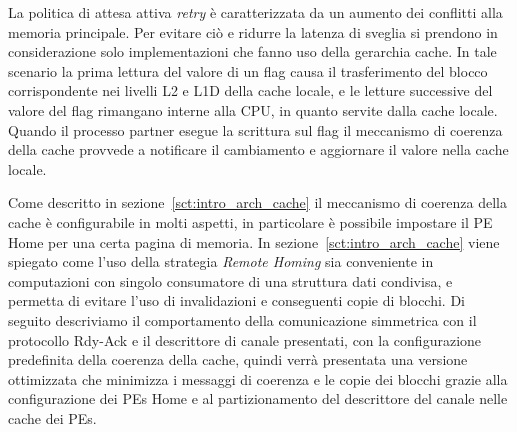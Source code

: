 La politica di attesa attiva \emph{retry} \`e caratterizzata da un aumento dei conflitti alla memoria principale. Per evitare ci\`o e ridurre la latenza di sveglia si prendono in considerazione solo implementazioni che fanno uso della gerarchia cache. In tale scenario la prima lettura del valore di un flag causa il trasferimento del blocco corrispondente nei livelli L2 e L1D della cache locale, e le letture successive del valore del flag rimangano interne alla CPU, in quanto servite dalla cache locale. Quando il processo partner esegue la scrittura sul flag il meccanismo di coerenza della cache provvede a notificare il cambiamento e aggiornare il valore nella cache locale.

Come descritto in sezione~\ref{sct:intro_arch_cache} il meccanismo di coerenza della cache \`e configurabile in molti aspetti, in particolare \`e possibile impostare il PE Home per una certa pagina di memoria. 
In sezione~\ref{sct:intro_arch_cache} viene spiegato come l'uso della strategia \emph{Remote Homing} sia conveniente in computazioni con singolo consumatore di una struttura dati condivisa, e permetta di evitare l'uso di invalidazioni e conseguenti copie di blocchi.
Di seguito descriviamo il comportamento della comunicazione simmetrica con il protocollo Rdy-Ack e il descrittore di canale presentati, con la configurazione predefinita della coerenza della cache, quindi verr\`a presentata una versione ottimizzata che minimizza i messaggi di coerenza e le copie dei blocchi grazie alla configurazione dei PEs Home e al partizionamento del descrittore del canale nelle cache dei PEs.

